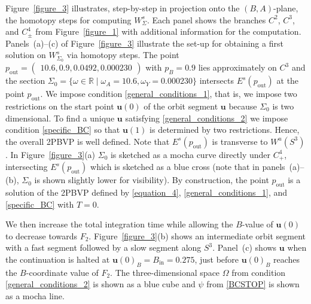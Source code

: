 \documentclass{ws-ijbc}
\begin{document}
Figure~\ref{figure_3} illustrates, step-by-step in projection onto the $(B,A)$-plane, the homotopy steps for computing $W^s_\Sigma$.  Each panel shows the branches $C^2$, $C^3$, and $C^4_\pm$ from Figure~\ref{figure_1} with additional information for the computation. Panels~(a)--(c) of  Figure~\ref{figure_3} illustrate the set-up for obtaining a first solution on $W^s_{\Sigma_0}$ via homotopy steps.  The point $p_{\text{out}}=\begin{pmatrix} 10.6, 0.9, 0.0492, 0.000230 \end{pmatrix}$ with $p_B=0.9$ lies approximately on $C^3$ and the section $\Sigma_0=\{\omega \in \mathbb{R} \; | \;  \omega_A=10.6, \omega_Y=0.000230\}$ intersects $E^s(p_\text{out})$ at the point $p_{\text{out}}$.  We impose condition \eqref{general_conditions_1}, that is, we impose two restrictions on the start point $\mathbf{u}(0)$ of the orbit segment $\mathbf{u}$ because $\Sigma_0$ is two dimensional.  To find a unique $\mathbf{u}$ satisfying \eqref{general_conditions_2} we impose condition \eqref{specific_BC} so that $\mathbf{u}(1)$ is determined by two restrictions.  Hence, the overall 2PBVP is well defined.  Note that $E^s(p_{\text{out}})$ is transverse to $W^u(S^3)$.  In Figure~\ref{figure_3}(a) $\Sigma_0$ is sketched as a mocha curve directly under $C^4_+$, intersecting $E^s(p_{\text{out}})$ which is sketched as a blue cross (note that in panels~(a)--(b), $\Sigma_0$ is shown slightly lower for visibility).  By construction, the point $p_{\text{out}}$ is a solution of the 2PBVP defined by \eqref{equation_4}, \eqref{general_conditions_1}, and \eqref{specific_BC} with $T=0$.

We then increase the total integration time while allowing the $B$-value of $\mathbf{u}(0)$ to decrease towards $F_2$.  Figure~\ref{figure_3}(b) shows an intermediate orbit segment with a fast segment followed by a slow segment along $S^3$.  Panel~(c) shows $\mathbf{u}$ when the continuation is halted at $\mathbf{u}(0)_B = B_{\text{in}}=0.275$, just before $\mathbf{u}(0)_B$ reaches the $B$-coordinate value of $F_2$.  The three-dimensional space $\Omega$ from condition \eqref{general_conditions_2} is shown as a blue cube and $\psi$ from \eqref{BCSTOP} is shown as a mocha line.
    
\end{document}
